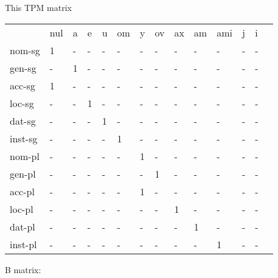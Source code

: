 \documentclass{article}
\begin{document}
 This TPM matrix  

\begin{tabular}{llllllllllllll}\toprule
                &nul     &a       &e       &u       &om      &y       &ov      &ax      &am      &ami     &j       &i       \\ 
nom-sg     &     1  &    -   &    -   &    -   &    -   &    -   &    -   &    -   &    -   &    -   &    -   &    -   \\ 
gen-sg     &    -   &     1  &    -   &    -   &    -   &    -   &    -   &    -   &    -   &    -   &    -   &    -   \\ 
acc-sg     &     1  &    -   &    -   &    -   &    -   &    -   &    -   &    -   &    -   &    -   &    -   &    -   \\ 
loc-sg     &    -   &    -   &     1  &    -   &    -   &    -   &    -   &    -   &    -   &    -   &    -   &    -   \\ 
dat-sg     &    -   &    -   &    -   &     1  &    -   &    -   &    -   &    -   &    -   &    -   &    -   &    -   \\ 
inst-sg    &    -   &    -   &    -   &    -   &     1  &    -   &    -   &    -   &    -   &    -   &    -   &    -   \\ 
nom-pl     &    -   &    -   &    -   &    -   &    -   &     1  &    -   &    -   &    -   &    -   &    -   &    -   \\ 
gen-pl     &    -   &    -   &    -   &    -   &    -   &    -   &     1  &    -   &    -   &    -   &    -   &    -   \\ 
acc-pl     &    -   &    -   &    -   &    -   &    -   &     1  &    -   &    -   &    -   &    -   &    -   &    -   \\ 
loc-pl     &    -   &    -   &    -   &    -   &    -   &    -   &    -   &     1  &    -   &    -   &    -   &    -   \\ 
dat-pl     &    -   &    -   &    -   &    -   &    -   &    -   &    -   &    -   &     1  &    -   &    -   &    -   \\ 
inst-pl    &    -   &    -   &    -   &    -   &    -   &    -   &    -   &    -   &    -   &     1  &    -   &    -   \\ 
\end{tabular}

 \vspace{0.2in}
 


B matrix:
\end{document}
